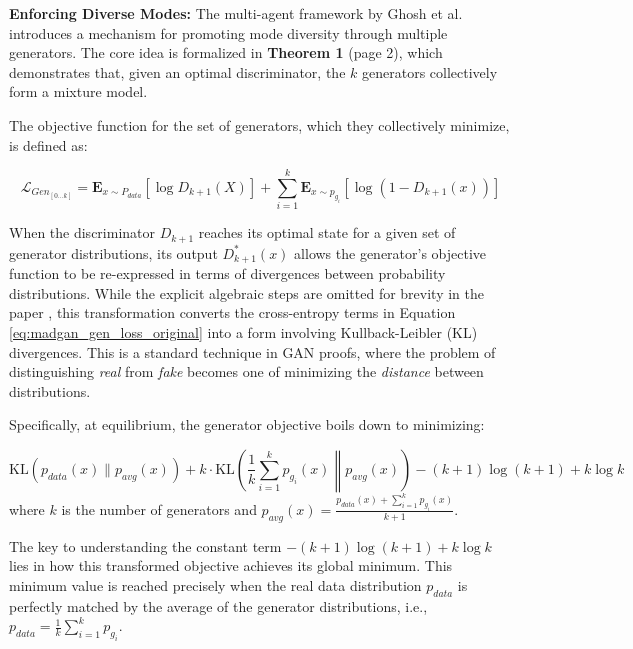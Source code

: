 \noindent\textbf{Enforcing Diverse Modes:}
The multi-agent framework by Ghosh et al. introduces a mechanism for promoting mode diversity through multiple generators. The core idea is formalized in \textbf{Theorem 1} \cite{ghosh2018madgan} (page 2), which demonstrates that, given an optimal discriminator, the \(k\) generators collectively form a mixture model.

The objective function for the set of generators, which they collectively minimize, is defined as:

\begin{equation}
\label{eq:madgan_gen_loss_original}
\mathcal{L}_{Gen_{[0...k]}} = \mathbf{E}_{x \sim P_{data}} [ \log D_{k+1}(X) ] + \sum_{i=1}^{k}\mathbf{E}_{x \sim p_{g_i}} [\log (1-D_{k+1}(x))]
\end{equation}

When the discriminator \(D_{k+1}\) reaches its optimal state for a given set of generator distributions, its output \(D^*_{k+1}(x)\) allows the generator's objective function to be re-expressed in terms of divergences between probability distributions. While the explicit algebraic steps are omitted for brevity in the paper \cite{ghosh2018madgan}, this transformation converts the cross-entropy terms in Equation \ref{eq:madgan_gen_loss_original} into a form involving Kullback-Leibler (KL) divergences. This is a standard technique in GAN proofs, where the problem of distinguishing \textit{real} from \textit{fake} becomes one of minimizing the \textit{distance} between distributions.

Specifically, at equilibrium, the generator objective boils down to minimizing:

\begin{equation}
\label{eq:madgan_theorem1_simplified}
\text{KL} \left( p_{data}(x) \| p_{avg}(x) \right) + k \cdot \text{KL} \left( \frac{1}{k}\sum_{i=1}^k p_{g_i}(x) \middle\| p_{avg}(x) \right) - (k+1)\log(k+1) + k\log k
\end{equation}
where \(k\) is the number of generators and \(p_{avg}(x) = \frac{p_{data}(x) + \sum_{i=1}^k p_{g_i}(x)}{k+1}\).

The key to understanding the constant term \( -(k+1)\log(k+1) + k\log k \) lies in how this transformed objective achieves its global minimum. This minimum value is reached precisely when the real data distribution \(p_{data}\) is perfectly matched by the average of the generator distributions, i.e., \(p_{data} = \frac{1}{k}\sum_{i=1}^{k} p_{g_i}\).

